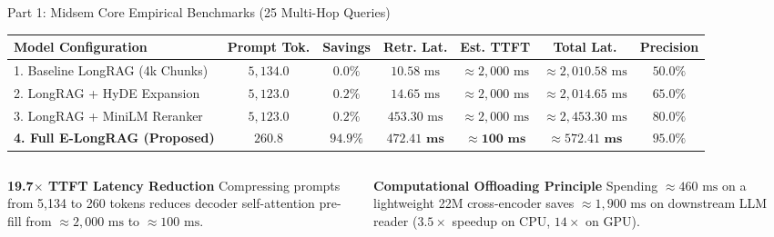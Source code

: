 \documentclass[10pt,aspectratio=169]{beamer}
\begin{document}
\begin{frame}{Part 1: Midsem Core Empirical Benchmarks (25 Multi-Hop Queries)}
    \begin{center}
    \scriptsize
    \begin{tabular}{lcccccc}
    \toprule
    \textbf{Model Configuration} & \textbf{Prompt Tok.} & \textbf{Savings} & \textbf{Retr. Lat.} & \textbf{Est. TTFT} & \textbf{Total Lat.} & \textbf{Precision} \\
    \midrule
    1. Baseline LongRAG (4k Chunks) & $5,134.0$ & $0.0\%$ & $10.58\text{ ms}$ & $\approx 2,000\text{ ms}$ & $\approx 2,010.58\text{ ms}$ & $50.0\%$ \\
    2. LongRAG + HyDE Expansion & $5,123.0$ & $0.2\%$ & $14.65\text{ ms}$ & $\approx 2,000\text{ ms}$ & $\approx 2,014.65\text{ ms}$ & $65.0\%$ \\
    3. LongRAG + MiniLM Reranker & $5,123.0$ & $0.2\%$ & $453.30\text{ ms}$ & $\approx 2,000\text{ ms}$ & $\approx 2,453.30\text{ ms}$ & $80.0\%$ \\
    \textbf{4. Full E-LongRAG (Proposed)} & $\mathbf{260.8}$ & $\mathbf{94.9\%}$ & $\mathbf{472.41\text{ ms}}$ & $\mathbf{\approx 100\text{ ms}}$ & $\mathbf{\approx 572.41\text{ ms}}$ & $\mathbf{95.0\%}$ \\
    \bottomrule
    \end{tabular}
    \end{center}

    \vspace{0.1cm}
    \begin{columns}[onlytextwidth,T]
        \begin{column}{0.48\textwidth}
            \begin{block}{\textbf{19.7$\times$ TTFT Latency Reduction}}
                \footnotesize
                Compressing prompts from 5,134 to 260 tokens reduces decoder self-attention pre-fill from $\approx 2,000\text{ ms}$ to $\approx 100\text{ ms}$.
            \end{block}
        \end{column}
        \begin{column}{0.48\textwidth}
            \begin{block}{\textbf{Computational Offloading Principle}}
                \footnotesize
                Spending $\approx 460\text{ ms}$ on a lightweight 22M cross-encoder saves $\approx 1,900\text{ ms}$ on downstream LLM reader ($3.5\times$ speedup on CPU, $14\times$ on GPU).
            \end{block}
        \end{column}
    \end{columns}
\end{frame}
\end{document}

